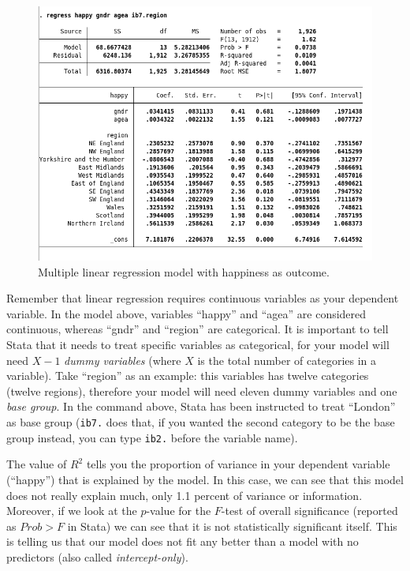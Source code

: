 \documentclass{article}
\begin{document}
\begin{figure}[H]
	\includegraphics[width=\linewidth]{../img/mult_reg1.png}
	\caption{Multiple linear regression model with happiness as outcome.}
\end{figure}

Remember that linear regression requires continuous variables as your dependent variable. In the model above, variables ``happy'' and ``agea'' are considered continuous, whereas ``gndr'' and ``region'' are categorical. It is important to tell Stata that it needs to treat specific variables as categorical, for your model will need $X-1$ \textit{dummy variables} (where $X$ is the total number of categories in a variable). Take ``region'' as an example: this variables has twelve categories (twelve regions), therefore your model will need eleven dummy variables and one \textit{base group}. In the command above, Stata has been instructed to treat ``London'' as base group (\texttt{ib7.} does that, if you wanted the second category to be the base group instead, you can type \texttt{ib2.} before the variable name).

The value of $R^2$ tells you the proportion of variance in your dependent variable (``happy'') that is explained by the model. In this case, we can see that this model does not really explain much, only 1.1 percent of variance or information. Moreover, if we look at the $p$-value for the $F$-test of overall significance (reported as $Prob > F$ in Stata) we can see that it is not statistically significant itself. This is telling us that our model does not fit any better than a model with no predictors (also called \textit{intercept-only}). 
\end{document}
